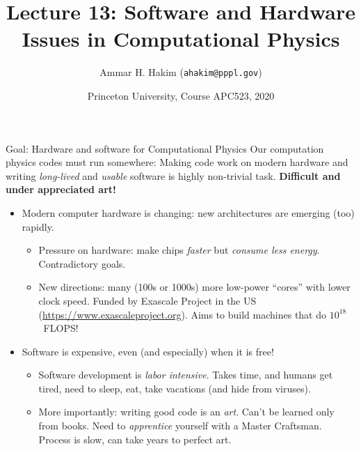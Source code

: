 \documentclass[aspectratio=169]{beamer}
\title[{\tt }] {Lecture 13: Software and Hardware Issues in Computational Physics}%
\author[https://apc523-2020.rtfd.io]%
{Ammar H. Hakim ({\tt ahakim@pppl.gov}) \inst{1}}%
\institute[PPPL]
{ \inst{1} Princeton Plasma Physics Laboratory, Princeton, NJ %
}
\date[3/23/2020]{Princeton University, Course APC523, 2020}
\newcommand{\mypause}{}
\newcommand{\cramplist}{
	\setlength{\itemsep}{0in}
	\setlength{\partopsep}{0in}
	\setlength{\topsep}{0in}}
\begin{document}
\begin{frame}[plain]
  \titlepage
\end{frame}

\begin{frame}{Goal: Hardware and software for Computational Physics}
  Our computation physics codes must run somewhere: Making code work
  on modern hardware and writing \emph{long-lived} and \emph{usable}
  software is highly non-trivial task. {\bf Difficult
    and under appreciated art!}
  \mypause%
  \begin{itemize}
  \item Modern computer hardware is changing: new architectures are
    emerging (too) rapidly.
    \begin{itemize}\cramplist
    \item Pressure on hardware: make chips \emph{faster} but
      \emph{consume less energy}. Contradictory goals.
    \item New directions: many (100s or 1000s) more low-power
      ``cores'' with lower clock speed. Funded by Exascale Project in
      the US (\url{https://www.exascaleproject.org}). Aims to build
      machines that do $10^{18}$~FLOPS!
    \end{itemize}
      \mypause%
  \item Software is expensive, even (and especially) when it is free!
    \begin{itemize}\cramplist
    \item Software development is \emph{labor intensive}. Takes time,
      and humans get tired, need to sleep, eat, take vacations (and
      hide from viruses).
    \item More importantly: writing good code is an \emph{art}. Can't
      be learned only from books. Need to \emph{apprentice} yourself
      with a Master Craftsman. Process is slow, can take years to
      perfect art.
    \end{itemize}
  \end{itemize}
\end{frame}
\end{document}
